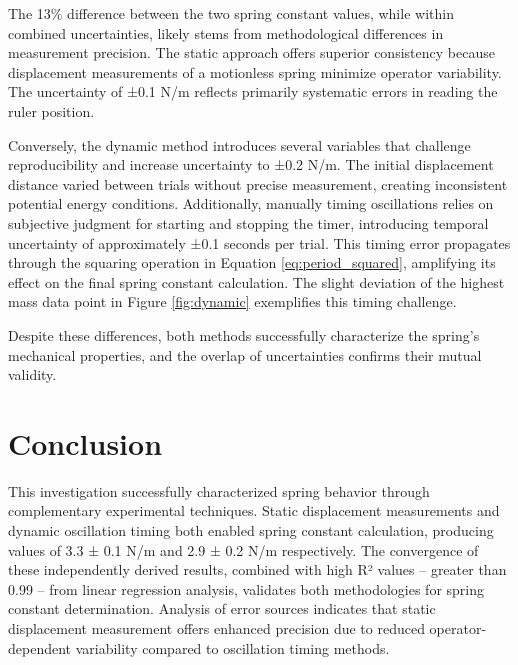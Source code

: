 \documentclass[12pt]{article}
\begin{document}
The 13\% difference between the two spring constant values, while within combined uncertainties, likely stems from methodological differences in measurement precision. The static approach offers superior consistency because displacement measurements of a motionless spring minimize operator variability. The uncertainty of ±0.1 N/m reflects primarily systematic errors in reading the ruler position.

Conversely, the dynamic method introduces several variables that challenge reproducibility and increase uncertainty to ±0.2 N/m. The initial displacement distance varied between trials without precise measurement, creating inconsistent potential energy conditions. Additionally, manually timing oscillations relies on subjective judgment for starting and stopping the timer, introducing temporal uncertainty of approximately ±0.1 seconds per trial. This timing error propagates through the squaring operation in Equation \ref{eq:period_squared}, amplifying its effect on the final spring constant calculation. The slight deviation of the highest mass data point in Figure \ref{fig:dynamic} exemplifies this timing challenge.

Despite these differences, both methods successfully characterize the spring's mechanical properties, and the overlap of uncertainties confirms their mutual validity.

\section*{Conclusion}

This investigation successfully characterized spring behavior through complementary experimental techniques. Static displacement measurements and dynamic oscillation timing both enabled spring constant calculation, producing values of 3.3 ± 0.1 N/m and 2.9 ± 0.2 N/m respectively. The convergence of these independently derived results, combined with high R² values -- greater than 0.99 -- from linear regression analysis, validates both methodologies for spring constant determination. Analysis of error sources indicates that static displacement measurement offers enhanced precision due to reduced operator-dependent variability compared to oscillation timing methods.
\end{document}
